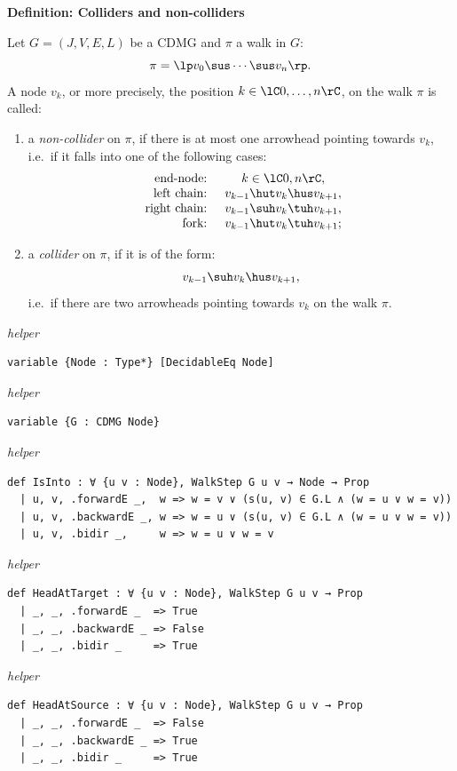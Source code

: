 \noindent\textbf{Definition: Colliders and non-colliders}\par\smallskip
{\appendixTexSize
  Let $G=(J,V,E,L)$ be a CDMG and $\pi$ a walk in $G$:
  \[ \pi =\lp  v_0 \sus \cdots \sus v_n \rp.  \]
  A node $v_k$, or more precisely, the position $k \in \lC 0,\dots, n \rC$,
  on the walk $\pi$ is called:
     \begin{enumerate}
     \item a \emph{non-collider} on $\pi$, if there is at most one arrowhead pointing towards $v_k$, i.e.\ if it falls into one of the following cases:
  \[\begin{array}{rccl}
    \text{ end-node: } & k \in \lC 0,n \rC, \\
    \text{ left chain: } & v_{k-1} \hut v_k \hus v_{k+1}, \\
    \text{ right chain: } & v_{k-1} \suh v_k \tuh v_{k+1},\\
    \text{ fork: } & v_{k-1} \hut v_k \tuh v_{k+1};
    \end{array}\]
  \item a \emph{collider} on $\pi$, if it is of the form: 
             \[v_{k-1} \suh v_k \hus v_{k+1},\] 
             i.e.\ if there are two arrowheads pointing towards $v_k$ on the walk $\pi$.
     \end{enumerate}
\par}
\smallskip
{\small\textit{helper}}
\begin{verbatim}
variable {Node : Type*} [DecidableEq Node]
\end{verbatim}
{\small\textit{helper}}
\begin{verbatim}
variable {G : CDMG Node}
\end{verbatim}
{\small\textit{helper}}
\begin{verbatim}
def IsInto : ∀ {u v : Node}, WalkStep G u v → Node → Prop
  | u, v, .forwardE _,  w => w = v ∨ (s(u, v) ∈ G.L ∧ (w = u ∨ w = v))
  | u, v, .backwardE _, w => w = u ∨ (s(u, v) ∈ G.L ∧ (w = u ∨ w = v))
  | u, v, .bidir _,     w => w = u ∨ w = v
\end{verbatim}
{\small\textit{helper}}
\begin{verbatim}
def HeadAtTarget : ∀ {u v : Node}, WalkStep G u v → Prop
  | _, _, .forwardE _  => True
  | _, _, .backwardE _ => False
  | _, _, .bidir _     => True
\end{verbatim}
{\small\textit{helper}}
\begin{verbatim}
def HeadAtSource : ∀ {u v : Node}, WalkStep G u v → Prop
  | _, _, .forwardE _  => False
  | _, _, .backwardE _ => True
  | _, _, .bidir _     => True
\end{verbatim}
